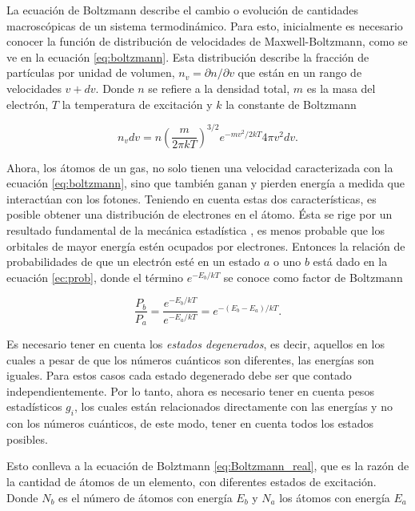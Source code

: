 \documentclass[12pt,oneside,openany,letter]{book}
\begin{document}
\noindent La ecuación de Boltzmann describe el cambio o evolución de cantidades macroscópicas de un sistema termodinámico. Para esto, inicialmente es necesario conocer la función de distribución de velocidades de Maxwell-Boltzmann, como se ve en la ecuación \ref{eq:boltzmann}. Esta distribución describe la fracción de partículas por unidad de volumen, $n_v = \partial n / \partial v$ que están en un rango de velocidades $v + dv$. Donde $n$ se refiere a la densidad total, $m$ es la masa del electrón, $T$ la temperatura de excitación y $k$ la constante de Boltzmann

\begin{equation}
n_{v} d v=n\left(\frac{m}{2 \pi k T}\right)^{3 / 2} e^{-m v^{2} / 2 k T} 4 \pi v^{2} d v.
\label{eq:boltzmann}
\end{equation}

\noindent Ahora, los átomos de un gas, no solo tienen una velocidad caracterizada con la ecuación \ref{eq:boltzmann}, sino  que también ganan y pierden energía a medida que interactúan con los fotones. Teniendo en cuenta estas dos características, es posible obtener una distribución de electrones en el átomo. Ésta se rige por un resultado fundamental de la mecánica estadística \citep{carroll2017introduction}, es menos probable que los orbitales de mayor energía estén ocupados por electrones. Entonces la relación de probabilidades de que un electrón esté en un estado $a$ o uno $b$ está dado en la ecuación \ref{ec:prob}, donde el término $e^{-E_{b} / k T}$ se conoce como factor de Boltzmann

\begin{equation}
\frac{P_b}{P_a}=\frac{e^{-E_{b} / k T}}{e^{-E_{a} / k T}}=e^{-\left(E_{b}-E_{a}\right) / k T}.
\label{ec:prob}
\end{equation}

\noindent Es necesario tener en cuenta los \textit{estados degenerados}, es decir, aquellos  en los cuales a pesar de que los números cuánticos son diferentes, las energías son iguales. Para estos casos cada estado degenerado debe ser que contado independientemente. Por lo tanto, ahora es necesario tener en cuenta pesos estadísticos $g_i$, los cuales están relacionados directamente con las energías y no con los números cuánticos, de este modo, tener en cuenta todos los estados posibles.

\noindent Esto conlleva a la ecuación de Bolztmann \ref{eq:Boltzmann_real}, que es la razón de la cantidad de átomos de un elemento, con diferentes estados de excitación. Donde $N_b$ es el número de átomos con energía $E_b$ y $N_a$ los átomos con energía $E_a$
\end{document}
